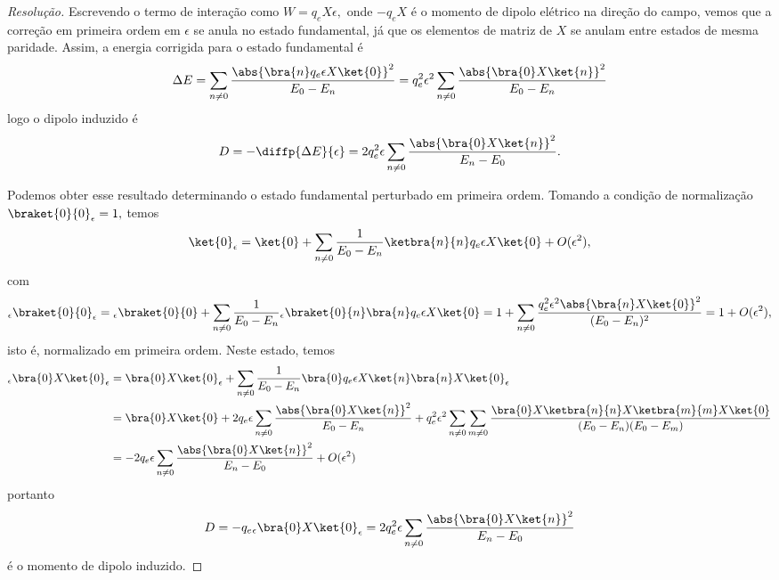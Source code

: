 \begin{proof}[Resolução]
     Escrevendo o termo de interação como \(W = q_e X \epsilon,\) onde \(-q_e X\) é o momento de dipolo elétrico na direção do campo, vemos que a correção em primeira ordem em \(\epsilon\) se anula no estado fundamental, já que os elementos de matriz de \(X\) se anulam entre estados de mesma paridade. Assim, a energia corrigida para o estado fundamental é
     \begin{equation*}
        \Delta E = \sum_{n \neq 0} \frac{\abs{\bra{n}q_e\epsilon X\ket{0}}^2}{E_0 - E_n} = q_e^2 \epsilon^2 \sum_{n \neq 0} \frac{\abs{\bra{0}X\ket{n}}^2}{E_0 - E_n}
     \end{equation*}
     logo o dipolo induzido é
     \begin{equation*}
        D = - \diffp{\Delta E}{\epsilon} = 2 q_e^2 \epsilon \sum_{n \neq 0} \frac{\abs{\bra{0}X\ket{n}}^2}{E_n - E_0}.
     \end{equation*}

     Podemos obter esse resultado determinando o estado fundamental perturbado em primeira ordem. Tomando a condição de normalização \(\braket{0}{0}_\epsilon = 1,\) temos
     \begin{equation*}
        \ket{0}_\epsilon = \ket{0} + \sum_{n \neq 0} \frac{1}{E_0 - E_n}\ketbra{n}{n}q_e \epsilon X\ket{0} + O(\epsilon^2),
     \end{equation*}
     com
     \begin{align*}
        _\epsilon\braket{0}{0}_\epsilon = {}_\epsilon\braket{0}{0} + \sum_{n \neq 0} \frac{1}{E_0 - E_n} {}_\epsilon\braket{0}{n}\bra{n}q_e \epsilon X\ket{0}
                                        = 1 + \sum_{n \neq 0} \frac{q_e^2 \epsilon^2\abs{\bra{n}X\ket{0}}^2}{(E_0 - E_n)^2}
                                        = 1 + O(\epsilon^2),
     \end{align*}
     isto é, normalizado em primeira ordem. Neste estado, temos
     \begin{align*}
        _\epsilon\bra{0}X\ket{0}_\epsilon &= \bra{0}X\ket{0}_\epsilon + \sum_{n\neq0} \frac{1}{E_0 - E_n} \bra{0} q_e \epsilon X \ket{n} \bra{n} X \ket{0}_\epsilon\\
                                          &= \bra{0} X \ket{0} + 2q_e \epsilon \sum_{n \neq 0} \frac{\abs{\bra{0}X\ket{n}}^2}{E_0 - E_n} + q_e^2 \epsilon^2\sum_{n \neq 0}\sum_{m \neq 0} \frac{\bra{0}X\ketbra{n}{n} X \ketbra{m}{m}X\ket{0}}{(E_0 - E_n)(E_0 - E_m)}\\
                                          &= -2q_e \epsilon \sum_{n \neq 0}\frac{\abs{\bra{0}X\ket{n}}^2}{E_n - E_0} + O(\epsilon^2)
     \end{align*}
     portanto
     \begin{equation*}
        D = -q_e {}_\epsilon\bra{0}X\ket{0}_{\epsilon} = 2 q_e^2 \epsilon \sum_{n \neq 0} \frac{\abs{\bra{0}X\ket{n}}^2}{E_n - E_0}
     \end{equation*}
     é o momento de dipolo induzido.
\end{proof}
